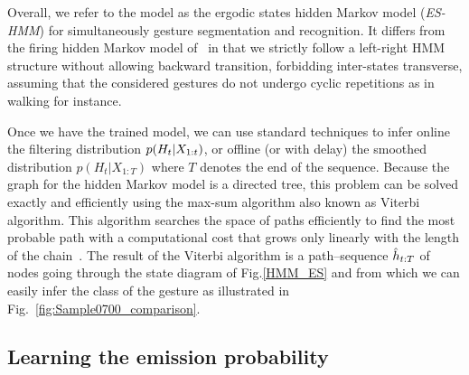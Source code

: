 Overall, we refer to the model as the ergodic states hidden Markov model (\emph{ES-HMM}) for simultaneously gesture segmentation and recognition. It  differs from the firing hidden Markov model of~\cite{nowozin2012action} in that we strictly follow a left-right HMM structure without allowing backward transition, forbidding inter-states transverse, assuming that the considered gestures do not undergo cyclic repetitions as in walking for instance.




Once we have the trained model, we can use standard techniques to infer online the filtering
distribution $p(H_t | X_{1:t})$,  or offline (or with delay)
the smoothed distribution $p(H_t | X_{1:T})$ where $T$ denotes the end of the sequence.
Because the graph for the hidden Markov model is a directed tree, this problem can be solved exactly and efficiently using the max-sum algorithm also known as Viterbi algorithm. This algorithm searches the space of paths efficiently to find the most probable path with a computational cost that grows only linearly with the length of the chain~\cite{bishop2006pattern}.
The result of the Viterbi algorithm is a path--sequence $\hat{h}_{t:T}$ of nodes going through the state diagram of
Fig.\ref{HMM_ES} and from which we can easily infer the class of the gesture as illustrated in Fig.~\ref{fig:Sample0700_comparison}.



\subsection{Learning the emission probability}
\label{sec:ProblemFormation}
\label{sec:emissionprob}

